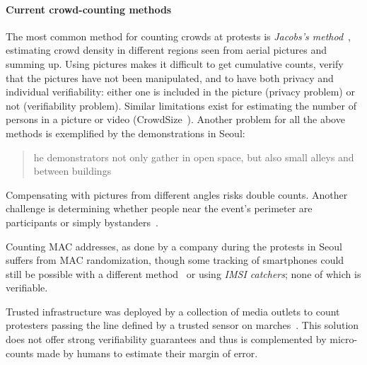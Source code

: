 \paragraph{Current crowd-counting methods}

The most common method for counting crowds at protests is \emph{Jacobs's method}~\cite{2016DemonstrationsInSeoul,BBCHowToCountProtestNumbers}, estimating crowd density in different regions seen from aerial pictures and summing up.  Using pictures makes it difficult to get cumulative counts, verify that the pictures have not been manipulated, and to have both privacy and individual verifiability: either one is included in the picture (privacy problem) or not (verifiability problem). Similar limitations exist for estimating the number of persons in a picture or video (\eg CrowdSize~\cite{CrowdSize}).
Another problem for all the above methods is exemplified by the demonstrations in Seoul:
\blockcquote{2016DemonstrationsInSeoul}{%
  he demonstrators not only gather in open space, but also small alleys and between buildings%
}.
Compensating with pictures from different angles risks double counts. Another challenge is 
determining whether people near the event's perimeter are participants or 
simply bystanders~\cite{HowToEstimateCrowdSize}.

Counting MAC addresses, as done by a company during the protests in Seoul~\cite{2016DemonstrationsInSeoul} suffers from MAC randomization, though some tracking of smartphones could still be possible with a different method~\cite{WhyMACRandomizationIsNotEnough} or using \emph{IMSI catchers}; none of which is verifiable.

Trusted infrastructure was deployed by a collection of media outlets to count protesters passing the line defined by a trusted sensor on marches~\cite{LeMondeProtestingSolution}. 
This solution does not offer strong verifiability guarantees and thus is complemented by micro-counts made by humans to estimate their margin of error.


